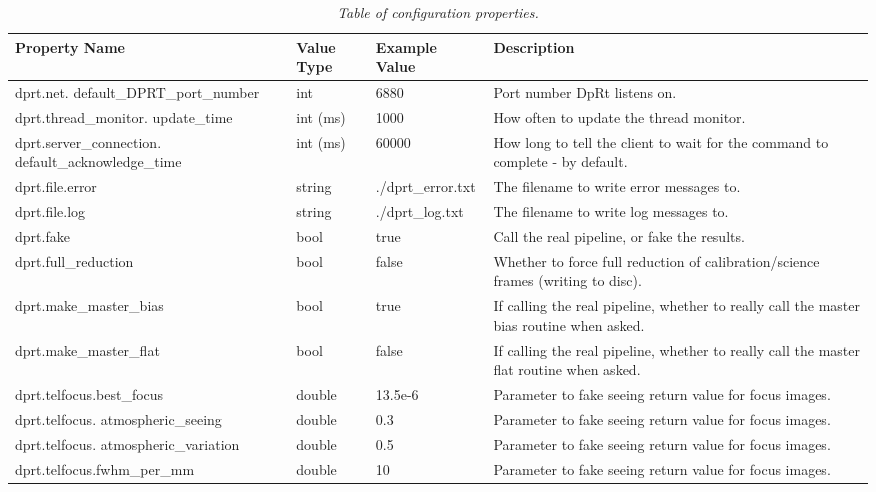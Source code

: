 \documentclass[10pt,a4paper]{article}
\begin{document}
\begin{table}[!h]
\begin{center}
\begin{footnotesize}
\begin{tabular}{|p{12em}|l|l|p{28em}|} \hline
{\bf Property Name} 	& {\bf Value Type} & {\bf Example Value} & {\bf Description}\\ \hline
dprt.net. default\_DPRT\_port\_number 		& int & 6880 & Port number DpRt listens on. \\ \hline
dprt.thread\_monitor. update\_time 		& int (ms) & 1000 & How often to update the thread monitor. \\ \hline
dprt.server\_connection. default\_acknowledge\_time & int (ms) & 60000 & How long to tell the client to wait for the command to complete - by default. \\ \hline
dprt.file.error 				& string & ./dprt\_error.txt & The filename to write error messages to. \\ \hline
dprt.file.log 					& string & ./dprt\_log.txt & The filename to write log messages to. \\ \hline
dprt.fake 					& bool & true & Call the real pipeline, or fake the results. \\ \hline
dprt.full\_reduction 				& bool & false & Whether to force full reduction of calibration/science frames (writing to disc). \\ \hline
dprt.make\_master\_bias 			& bool & true & If calling the real pipeline, whether to really call the master bias routine when asked. \\ \hline
dprt.make\_master\_flat 			& bool & false & If calling the real pipeline, whether to really call the master flat routine when asked. \\ \hline
dprt.telfocus.best\_focus 			& double & 13.5e-6 & Parameter to fake seeing return value for focus images. \\ \hline
dprt.telfocus. atmospheric\_seeing 		& double & 0.3 & Parameter to fake seeing return value for focus images. \\ \hline
dprt.telfocus. atmospheric\_variation	 	& double & 0.5 & Parameter to fake seeing return value for focus images. \\ \hline
dprt.telfocus.fwhm\_per\_mm 			& double & 10 & Parameter to fake seeing return value for focus images. \\ \hline
\end{tabular}
\end{footnotesize}
\end{center}
\caption{\em Table of configuration properties.}
\label{tab:configproperties} 
\end{table}
\end{document}
